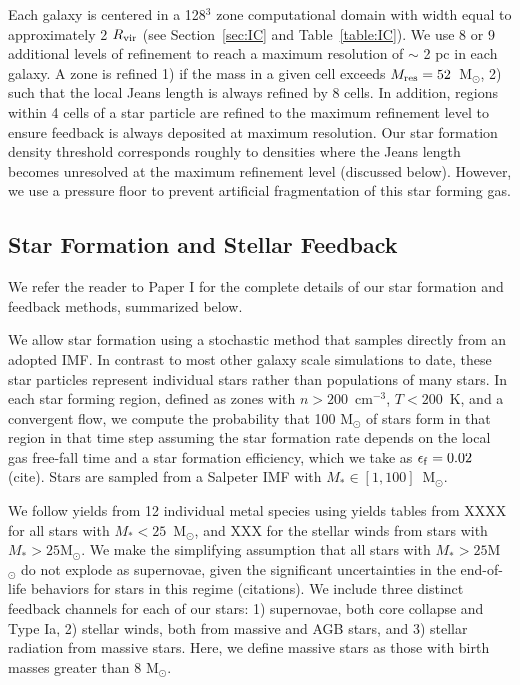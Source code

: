 \documentclass[twocolumn]{aastex61}
\begin{document}
Each galaxy is centered in a 128$^{3}$ zone computational domain with width equal to approximately 2 $R_{\rm vir}$ (see Section~\ref{sec:IC} and Table~\ref{table:IC}). We use 8 or 9 additional levels of refinement to reach a maximum resolution of $\sim$ 2 pc in each galaxy. A zone is refined 1) if the mass in a given cell exceeds $M_{\rm res} = 52 $~M$_{\odot}$, 2) such that the local Jeans length is always refined by 8 cells. In addition, regions within 4 cells of a star particle are refined to the maximum refinement level to ensure feedback is always deposited at maximum resolution. Our star formation density threshold corresponds roughly to densities where the Jeans length becomes unresolved at the maximum refinement level (discussed below). However, we use a pressure floor to prevent artificial fragmentation of this star forming gas. 

\subsection{Star Formation and Stellar Feedback}
We refer the reader to Paper I for the complete details of our star formation and feedback methods, summarized below. 

We allow star formation using a stochastic method \citep{Goldbaum2015,Goldbaum2016} that samples directly from an adopted IMF. In contrast to most other galaxy scale simulations to date, these star particles represent individual stars rather than populations of many stars. In each star forming region, defined as zones with $n > 200$~cm$^{-3}$, $T < 200$~K, and a convergent flow, we compute the probability that 100 M$_{\odot}$ of stars form in that region in that time step assuming the star formation rate depends on the local gas free-fall time and a star formation efficiency, which we take as $\epsilon_{\rm f} = 0.02$ (cite). Stars are sampled from a Salpeter IMF with $M_{*} \in [1,100]$~M$_{\odot}$. 

We follow yields from 12 individual metal species using yields tables from XXXX for all stars with $M_{*} < 25$~M$_{\odot}$, and XXX for the stellar winds from stars with $M_{*} > 25$M$_{\odot}$. We make the simplifying assumption that all stars with $M_{*} > 25$M~$_{\odot}$ do not explode as supernovae, given the significant uncertainties in the end-of-life behaviors for stars in this regime (citations). We include three distinct feedback channels for each of our stars: 1) supernovae, both core collapse and Type Ia, 2) stellar winds, both from massive and AGB stars, and 3) stellar radiation from massive stars. Here, we define massive stars as those with birth masses greater than 8 M$_{\odot}$. 
\end{document}
